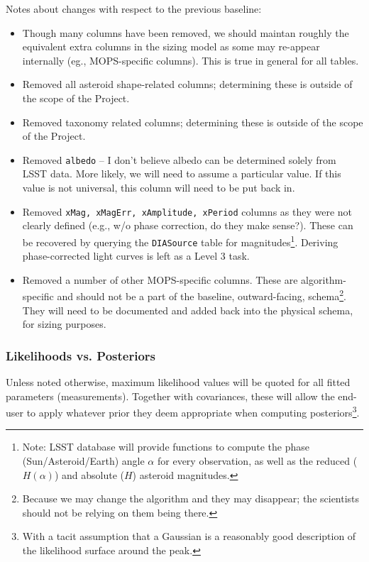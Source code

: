 \documentclass[12pt]{article}
\newcommand{\code}[1]{\texttt{#1}}
\newcommand{\DIASource}{\code{DIASource}\xspace}
\begin{document}
Notes about changes with respect to the previous baseline:
\begin{itemize}
\item Though many columns have been removed, we should maintan roughly the equivalent extra columns in the sizing model as some may re-appear internally (eg., MOPS-specific columns). This is true in general for all tables.
\item Removed all asteroid shape-related columns; determining these is outside of the scope of the Project.
\item Removed taxonomy related columns; determining these is outside of the scope of the Project.
\item Removed \texttt{albedo} -- I don't believe albedo can be determined solely from LSST data. More likely, we will need to assume a particular value. If this value is not universal, this column will need to be put back in.
\item Removed \texttt{xMag, xMagErr, xAmplitude, xPeriod} columns as they were not clearly defined (e.g., w/o phase correction, do they make sense?). These can be recovered by querying the \DIASource table for magnitudes\footnote{Note: LSST database will provide functions to compute the phase (Sun/Asteroid/Earth) angle $\alpha$ for every observation, as well as the reduced ($H(\alpha)$) and absolute ($H$) asteroid magnitudes.}. Deriving phase-corrected light curves is left as a Level 3 task.
\item Removed a number of other MOPS-specific columns. These are algorithm-specific and should not be a part of the baseline, outward-facing, schema\footnote{Because we may change the algorithm and they may disappear; the scientists should not be relying on them being there.}. They will need to be documented and added back into the physical schema, for sizing purposes.
\end{itemize}

\subsubsection{Likelihoods vs. Posteriors}

Unless noted otherwise, maximum likelihood values will be quoted for all fitted parameters (measurements). Together with covariances, these will allow the end-user to apply whatever prior they deem appropriate when computing posteriors\footnote{With a tacit assumption that a Gaussian is a reasonably good description of the likelihood surface around the peak.}.
\end{document}
